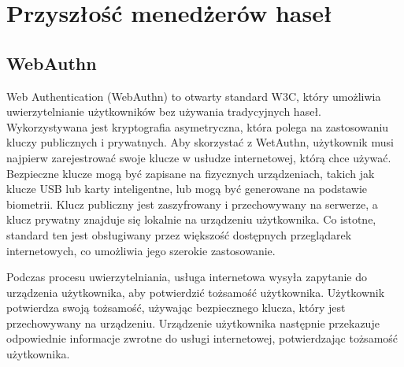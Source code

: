 \section{Przyszłość menedżerów haseł}

\subsection{WebAuthn}

Web Authentication (WebAuthn) to otwarty standard W3C, który umożliwia uwierzytelnianie użytkowników bez używania tradycyjnych haseł. Wykorzystywana jest kryptografia asymetryczna, która polega na zastosowaniu kluczy publicznych i prywatnych. Aby skorzystać z WetAuthn, użytkownik musi najpierw zarejestrować swoje  klucze w usłudze internetowej, którą chce używać. Bezpieczne klucze mogą być zapisane na fizycznych urządzeniach, takich jak klucze USB lub karty inteligentne, lub mogą być generowane na podstawie biometrii. Klucz publiczny jest zaszyfrowany i przechowywany na serwerze, a klucz prywatny znajduje się lokalnie na urządzeniu użytkownika. Co istotne, standard ten jest obsługiwany przez większość dostępnych przeglądarek internetowych, co umożliwia jego szerokie zastosowanie.

Podczas procesu uwierzytelniania, usługa internetowa wysyła zapytanie do urządzenia użytkownika, aby potwierdzić tożsamość użytkownika. Użytkownik potwierdza swoją tożsamość, używając bezpiecznego klucza, który jest przechowywany na urządzeniu. Urządzenie użytkownika następnie przekazuje odpowiednie informacje zwrotne do usługi internetowej, potwierdzając tożsamość użytkownika.